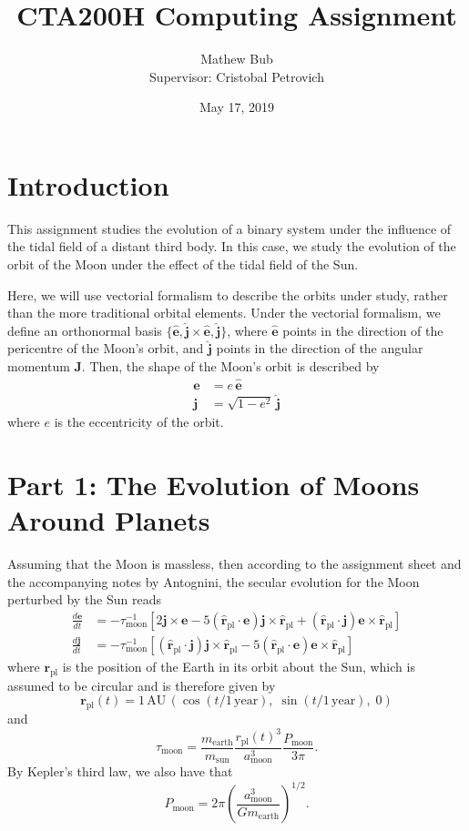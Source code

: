 \documentclass[11pt]{article}
\title{CTA200H Computing Assignment}
\author{Mathew Bub \\ Supervisor: Cristobal Petrovich}
\date{May 17, 2019}
\newcommand{\evec}{\mathbf{e}}
\newcommand{\ehat}{\hat{\evec}}
\newcommand{\jvec}{{\mathbf{j}}}
\newcommand{\jhat}{\hat{\jvec}}
\newcommand{\Jvec}{\mathbf{J}}
\newcommand{\rpl}{\mathbf{r_{\mathrm{pl}}}}
\newcommand{\rplhat}{\mathbf{\hat{r}_{\mathrm{pl}}}}
\begin{document}
\maketitle

\section*{Introduction}
This assignment studies the evolution of a binary system under the influence of the tidal field of a distant third body. In this case, we study the evolution of the orbit of the Moon under the effect of the tidal field of the Sun.

Here, we will use vectorial formalism \parencite{tremaine2014} to describe the orbits under study, rather than the more traditional orbital elements. Under the vectorial formalism, we define an orthonormal basis $\{\ehat, \jhat \times \ehat, \jhat\}$, where $\ehat$ points in the direction of the pericentre of the Moon's orbit, and $\jhat$ points in the direction of the angular momentum $\Jvec$. Then, the shape of the Moon's orbit is described by
\begin{align}
    \evec &= e \, \ehat \label{eq:evec} \\
    \jvec &= \sqrt{1-e^2} \, \jhat \label{eq:jvec}
\end{align}
where $e$ is the eccentricity of the orbit. 

\section*{Part 1: The Evolution of Moons Around Planets}
Assuming that the Moon is massless, then according to the assignment sheet and the accompanying notes by Antognini, the secular evolution for the Moon perturbed by the Sun reads
\begin{align}
    \frac{d\evec}{dt} &= -\tau_{\mathrm{moon}}^{-1}[2 \jvec \times \evec - 5(\rplhat \cdot \evec) \jvec \times \rplhat + (\rplhat \cdot \jvec) \evec \times \rplhat] \label{eq:devec} \\
    \frac{d\jvec}{dt} &= -\tau_{\mathrm{moon}}^{-1}[(\rplhat \cdot \jvec) \jvec \times \rplhat - 5(\rplhat \cdot \evec) \evec \times \rplhat] \label{eq:djvec}
\end{align}
where $\rpl$ is the position of the Earth in its orbit about the Sun, which is assumed to be circular and is therefore given by
\begin{equation} \label{eq:rpl}
    \rpl(t) = 1 \, \mathrm{AU} \, (\cos(t/1 \, \mathrm{year}), \; \sin(t/1 \, \mathrm{year}), \; 0)
\end{equation}
and
\begin{equation} \label{eq:tau}
    \tau_{\mathrm{moon}} = \frac{m_{\mathrm{earth}}}{m_{\mathrm{sun}}} \frac{r_{\mathrm{pl}}(t)^3}{a_{\mathrm{moon}}^3} \frac{P_{\mathrm{moon}}}{3 \pi}.
\end{equation}
By Kepler's third law, we also have that
\begin{equation} \label{eq:Pmoon}
    P_{\mathrm{moon}} = 2\pi \left( \frac{a_{\mathrm{moon}}^3}{Gm_{\mathrm{earth}}} \right)^{1/2}.
\end{equation}
\end{document}
